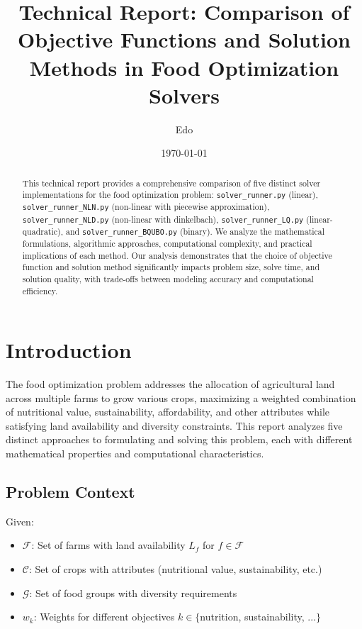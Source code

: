 \documentclass[11pt,a4paper]{article}
\title{\textbf{Technical Report: Comparison of Objective Functions and Solution Methods in Food Optimization Solvers}}
\author{Edo}
\date{\today}
\begin{document}
\maketitle

\begin{abstract}
This technical report provides a comprehensive comparison of five distinct solver implementations for the food optimization problem: \texttt{solver\_runner.py} (linear), \texttt{solver\_runner\_NLN.py} (non-linear with piecewise approximation), \texttt{solver\_runner\_NLD.py} (non-linear with dinkelbach), \texttt{solver\_runner\_LQ.py} (linear-quadratic), and \texttt{solver\_runner\_BQUBO.py} (binary). We analyze the mathematical formulations, algorithmic approaches, computational complexity, and practical implications of each method. Our analysis demonstrates that the choice of objective function and solution method significantly impacts problem size, solve time, and solution quality, with trade-offs between modeling accuracy and computational efficiency.
\end{abstract}

\section{Introduction}

The food optimization problem addresses the allocation of agricultural land across multiple farms to grow various crops, maximizing a weighted combination of nutritional value, sustainability, affordability, and other attributes while satisfying land availability and diversity constraints. This report analyzes five distinct approaches to formulating and solving this problem, each with different mathematical properties and computational characteristics.

\subsection{Problem Context}

Given:
\begin{itemize}
    \item $\mathcal{F}$: Set of farms with land availability $L_f$ for $f \in \mathcal{F}$
    \item $\mathcal{C}$: Set of crops with attributes (nutritional value, sustainability, etc.)
    \item $\mathcal{G}$: Set of food groups with diversity requirements
    \item $w_k$: Weights for different objectives $k \in \{$nutrition, sustainability, ...$\}$
\end{itemize}
\end{document}
